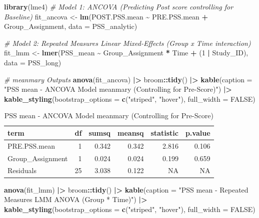\documentclass[
]{article}
\newenvironment{Shaded}{\begin{snugshade}}{\end{snugshade}}
\newcommand{\AttributeTok}[1]{\textcolor[rgb]{0.13,0.29,0.53}{#1}}
\newcommand{\CommentTok}[1]{\textcolor[rgb]{0.56,0.35,0.01}{\textit{#1}}}
\newcommand{\ConstantTok}[1]{\textcolor[rgb]{0.56,0.35,0.01}{#1}}
\newcommand{\DecValTok}[1]{\textcolor[rgb]{0.00,0.00,0.81}{#1}}
\newcommand{\FunctionTok}[1]{\textcolor[rgb]{0.13,0.29,0.53}{\textbf{#1}}}
\newcommand{\NormalTok}[1]{#1}
\newcommand{\OtherTok}[1]{\textcolor[rgb]{0.56,0.35,0.01}{#1}}
\newcommand{\SpecialCharTok}[1]{\textcolor[rgb]{0.81,0.36,0.00}{\textbf{#1}}}
\newcommand{\StringTok}[1]{\textcolor[rgb]{0.31,0.60,0.02}{#1}}
\begin{document}
\begin{Shaded}
\begin{Highlighting}[]
\FunctionTok{library}\NormalTok{(lme4)}
\CommentTok{\# Model 1: ANCOVA (Predicting Post score controlling for Baseline)}
\NormalTok{fit\_ancova }\OtherTok{\textless{}{-}} \FunctionTok{lm}\NormalTok{(POST.PSS.mean }\SpecialCharTok{\textasciitilde{}}\NormalTok{ PRE.PSS.mean }\SpecialCharTok{+}\NormalTok{ Group\_Assignment, }\AttributeTok{data =}\NormalTok{ PSS\_analytic)}

\CommentTok{\# Model 2: Repeated Measures Linear Mixed{-}Effects (Group x Time interaction)}
\NormalTok{fit\_lmm }\OtherTok{\textless{}{-}} \FunctionTok{lmer}\NormalTok{(PSS\_mean }\SpecialCharTok{\textasciitilde{}}\NormalTok{ Group\_Assignment }\SpecialCharTok{*}\NormalTok{ Time }\SpecialCharTok{+}\NormalTok{ (}\DecValTok{1} \SpecialCharTok{|}\NormalTok{ Study\_ID), }\AttributeTok{data =}\NormalTok{ PSS\_long)}

\CommentTok{\# meanmary Outputs}
\FunctionTok{anova}\NormalTok{(fit\_ancova) }\SpecialCharTok{|\textgreater{}} 
\NormalTok{  broom}\SpecialCharTok{::}\FunctionTok{tidy}\NormalTok{() }\SpecialCharTok{|\textgreater{}} 
  \FunctionTok{kable}\NormalTok{(}\AttributeTok{caption =} \StringTok{"PSS mean {-} ANCOVA Model meanmary (Controlling for Pre{-}Score)"}\NormalTok{) }\SpecialCharTok{|\textgreater{}} 
  \FunctionTok{kable\_styling}\NormalTok{(}\AttributeTok{bootstrap\_options =} \FunctionTok{c}\NormalTok{(}\StringTok{"striped"}\NormalTok{, }\StringTok{"hover"}\NormalTok{), }\AttributeTok{full\_width =} \ConstantTok{FALSE}\NormalTok{)}
\end{Highlighting}
\end{Shaded}

\begin{longtable}[t]{lrrrrr}
\caption{\label{tab:unnamed-chunk-9}PSS mean - ANCOVA Model meanmary (Controlling for Pre-Score)}\\
\toprule
term & df & sumsq & meansq & statistic & p.value\\
\midrule
PRE.PSS.mean & 1 & 0.342 & 0.342 & 2.816 & 0.106\\
Group\_Assignment & 1 & 0.024 & 0.024 & 0.199 & 0.659\\
Residuals & 25 & 3.038 & 0.122 & NA & NA\\
\bottomrule
\end{longtable}

\begin{Shaded}
\begin{Highlighting}[]
\FunctionTok{anova}\NormalTok{(fit\_lmm) }\SpecialCharTok{|\textgreater{}} 
\NormalTok{  broom}\SpecialCharTok{::}\FunctionTok{tidy}\NormalTok{() }\SpecialCharTok{|\textgreater{}} 
  \FunctionTok{kable}\NormalTok{(}\AttributeTok{caption =} \StringTok{"PSS mean {-} Repeated Measures LMM ANOVA (Group * Time)"}\NormalTok{) }\SpecialCharTok{|\textgreater{}} 
  \FunctionTok{kable\_styling}\NormalTok{(}\AttributeTok{bootstrap\_options =} \FunctionTok{c}\NormalTok{(}\StringTok{"striped"}\NormalTok{, }\StringTok{"hover"}\NormalTok{), }\AttributeTok{full\_width =} \ConstantTok{FALSE}\NormalTok{)}
\end{Highlighting}
\end{Shaded}
\end{document}

